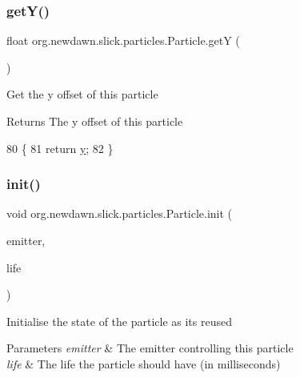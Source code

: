 \subsubsection{\texorpdfstring{get\+Y()}{getY()}}
{\footnotesize\ttfamily float org.\+newdawn.\+slick.\+particles.\+Particle.\+getY (\begin{DoxyParamCaption}{ }\end{DoxyParamCaption})\hspace{0.3cm}{\ttfamily [inline]}}

Get the y offset of this particle

\begin{DoxyReturn}{Returns}
The y offset of this particle 
\end{DoxyReturn}

\begin{DoxyCode}
80                         \{
81         \textcolor{keywordflow}{return} \mbox{\hyperlink{classorg_1_1newdawn_1_1slick_1_1particles_1_1_particle_ad784e37c1fdad77abc886521b8e907b2}{y}};
82     \}
\end{DoxyCode}
\mbox{\label{classorg_1_1newdawn_1_1slick_1_1particles_1_1_particle_a44da43f3a4be43a49778754e8790c876}} 
\subsubsection{\texorpdfstring{init()}{init()}}
{\footnotesize\ttfamily void org.\+newdawn.\+slick.\+particles.\+Particle.\+init (\begin{DoxyParamCaption}\item[{\mbox{\hyperlink{interfaceorg_1_1newdawn_1_1slick_1_1particles_1_1_particle_emitter}{Particle\+Emitter}}}]{emitter,  }\item[{float}]{life }\end{DoxyParamCaption})\hspace{0.3cm}{\ttfamily [inline]}}

Initialise the state of the particle as it\textquotesingle{}s reused


\begin{DoxyParams}{Parameters}
{\em emitter} & The emitter controlling this particle \\
\hline
{\em life} & The life the particle should have (in milliseconds) \\
\hline
\end{DoxyParams}

